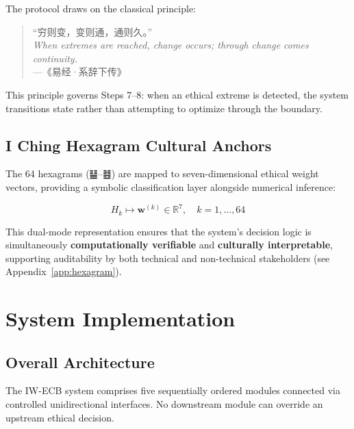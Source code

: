 \documentclass[conference]{IEEEtran}
\begin{document}
The protocol draws on the classical principle:

\begin{quote}
``穷则变，变则通，通则久。''\\
\textit{When extremes are reached, change occurs;
through change comes continuity.}\\
\hfill---《易经·系辞下传》
\end{quote}

This principle governs Steps 7--8: when an ethical extreme
is detected, the system transitions state rather than
attempting to optimize through the boundary.

\subsection{I Ching Hexagram Cultural Anchors}

The 64 hexagrams (䷊--䷾) are mapped to seven-dimensional
ethical weight vectors, providing a symbolic classification
layer alongside numerical inference:

\begin{equation}
  H_k \mapsto \mathbf{w}^{(k)} \in \mathbb{R}^7,
  \quad k = 1, \ldots, 64
  \label{eq:hexagram}
\end{equation}

This dual-mode representation ensures that the system's
decision logic is simultaneously \textbf{computationally
verifiable} and \textbf{culturally interpretable}, supporting
auditability by both technical and non-technical stakeholders
(see Appendix~\ref{app:hexagram}).

\section{System Implementation}

\subsection{Overall Architecture}

The IW-ECB system comprises five sequentially ordered modules
connected via controlled unidirectional interfaces. No
downstream module can override an upstream ethical decision.
\end{document}
